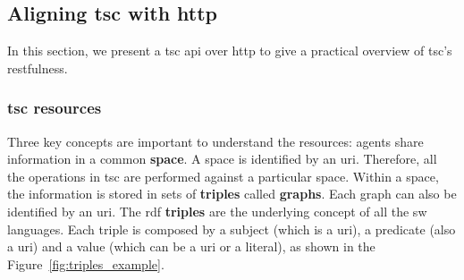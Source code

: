 


\subsection{Aligning \acs{tsc} with \acs{http}}


In this section, we present a \ac{tsc} \acs{api} over \ac{http} to give a practical overview of \ac{tsc}'s \acs{rest}fulness.

\subsubsection{\acs{tsc} resources}

Three key concepts are important to understand the resources: agents share information in a common \textbf{space}.
A space is identified by an \acs{uri}.
Therefore, all the operations in \ac{tsc} are performed against a particular space.
Within a space, the information is stored in sets of \textbf{triples} called \textbf{graphs}.
Each graph can also be identified by an \acs{uri}.
The \acs{rdf} \textbf{triples} are the underlying concept of all the \ac{sw} languages.
Each triple is composed by a subject (which is a \acs{uri}), a predicate (also a \acs{uri}) and a value (which can be a \acs{uri} or a literal), as shown in the Figure~\ref{fig:triples_example}.

